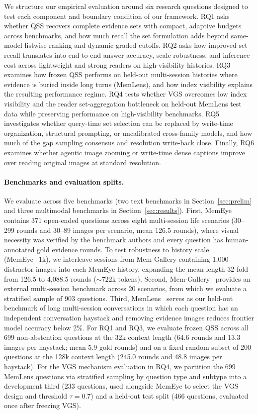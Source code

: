 \documentclass[10pt]{article}
\newcommand{\qss}{QSS}
\begin{document}
We structure our empirical evaluation around six research questions designed to test each component and boundary condition of our framework. RQ1 asks whether \qss{} recovers complete evidence sets with compact, adaptive budgets across benchmarks, and how much recall the set formulation adds beyond same-model listwise ranking and dynamic graded cutoffs. RQ2 asks how improved set recall translates into end-to-end answer accuracy, scale robustness, and inference cost across lightweight and strong readers on high-visibility histories. RQ3 examines how frozen \qss{} performs on held-out multi-session histories where evidence is buried inside long turns (MemLens), and how index visibility explains the resulting performance regime. RQ4 tests whether VGS overcomes low index visibility and the reader set-aggregation bottleneck on held-out MemLens test data while preserving performance on high-visibility benchmarks. RQ5 investigates whether query-time set selection can be replaced by write-time organization, structural prompting, or uncalibrated cross-family models, and how much of the gap sampling consensus and resolution write-back close. Finally, RQ6 examines whether agentic image zooming or write-time dense captions improve over reading original images at standard resolution.

\paragraph{Benchmarks and evaluation splits.} We evaluate across five benchmarks (two text benchmarks in Section~\ref{sec:prelim} and three multimodal benchmarks in Section~\ref{sec:results}). First, MemEye~\citep{guo2026memeye} contains 371 open-ended questions across eight multi-session life scenarios (30--299 rounds and 30--89 images per scenario, mean 126.5 rounds), where visual necessity was verified by the benchmark authors and every question has human-annotated gold evidence rounds. To test robustness to history scale (MemEye+1k), we interleave sessions from Mem-Gallery containing 1,000 distractor images into each MemEye history, expanding the mean length 32-fold from 126.5 to 4,088.5 rounds ($\sim 722\text{k}$ tokens). Second, Mem-Gallery~\citep{bei2026memgallery} provides an external multi-session benchmark across 20 scenarios, from which we evaluate a stratified sample of 903 questions. Third, MemLens~\citep{ren2026memlens} serves as our held-out benchmark of long multi-session conversations in which each question has an independent conversation haystack and removing evidence images reduces frontier model accuracy below 2\%. For RQ1 and RQ3, we evaluate frozen \qss{} across all 699 non-abstention questions at the 32k context length (64.6 rounds and 13.3 images per haystack; mean 5.9 gold rounds) and on a fixed random subset of 200 questions at the 128k context length (245.0 rounds and 48.8 images per haystack). For the VGS mechanism evaluation in RQ4, we partition the 699 MemLens questions via stratified sampling by question type and subtype into a development third (233 questions, used alongside MemEye to select the VGS design and threshold $\tau{=}0.7$) and a held-out test split (466 questions, evaluated once after freezing VGS).
\end{document}
